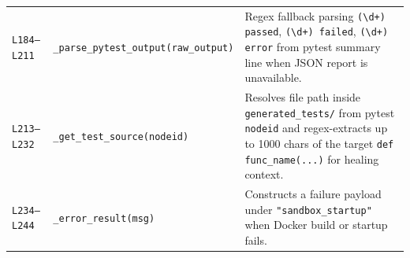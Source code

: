 \documentclass[11pt,a4paper]{article}
\begin{document}
\begin{longtable}{L{1.4cm} L{5.2cm} L{9.0cm}}
\texttt{L184--L211} & \texttt{\_parse\_pytest\_output(raw\_output)} & Regex fallback parsing \texttt{(\textbackslash d+) passed}, \texttt{(\textbackslash d+) failed}, \texttt{(\textbackslash d+) error} from pytest summary line when JSON report is unavailable. \\
\texttt{L213--L232} & \texttt{\_get\_test\_source(nodeid)} & Resolves file path inside \texttt{generated\_tests/} from pytest \texttt{nodeid} and regex-extracts up to 1000 chars of the target \texttt{def func\_name(...)} for healing context. \\
\texttt{L234--L244} & \texttt{\_error\_result(msg)} & Constructs a failure payload under \texttt{"sandbox\_startup"} when Docker build or startup fails. \\
\bottomrule
\end{longtable}

\end{document}
